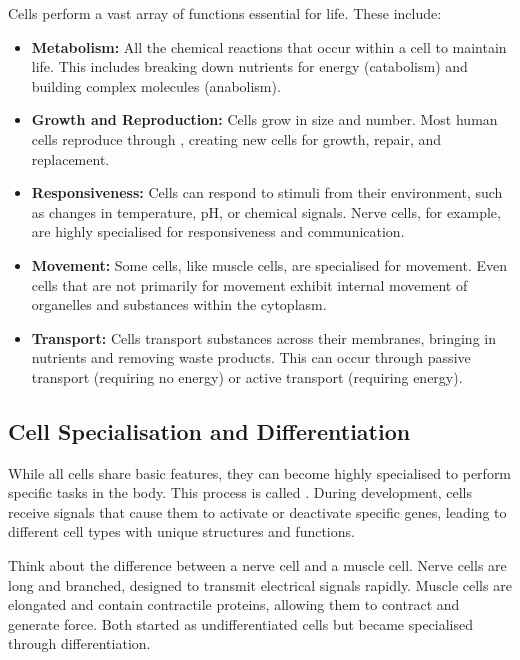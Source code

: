 Cells perform a vast array of functions essential for life. These include:

\begin{itemize}
    \item \textbf{Metabolism:} All the chemical reactions that occur within a cell to maintain life. This includes breaking down nutrients for energy (catabolism) and building complex molecules (anabolism).
    \item \textbf{Growth and Reproduction:} Cells grow in size and number.  Most human cells reproduce through , creating new cells for growth, repair, and replacement.
    \item \textbf{Responsiveness:} Cells can respond to stimuli from their environment, such as changes in temperature, pH, or chemical signals. Nerve cells, for example, are highly specialised for responsiveness and communication.
    \item \textbf{Movement:} Some cells, like muscle cells, are specialised for movement. Even cells that are not primarily for movement exhibit internal movement of organelles and substances within the cytoplasm.
    \item \textbf{Transport:} Cells transport substances across their membranes, bringing in nutrients and removing waste products. This can occur through passive transport (requiring no energy) or active transport (requiring energy). 
\end{itemize}

\subsection{Cell Specialisation and Differentiation}

While all cells share basic features, they can become highly specialised to perform specific tasks in the body. This process is called .  During development, cells receive signals that cause them to activate or deactivate specific genes, leading to different cell types with unique structures and functions.

\begin{example}
Think about the difference between a nerve cell and a muscle cell. Nerve cells are long and branched, designed to transmit electrical signals rapidly. Muscle cells are elongated and contain contractile proteins, allowing them to contract and generate force. Both started as undifferentiated cells but became specialised through differentiation.
\end{example}

